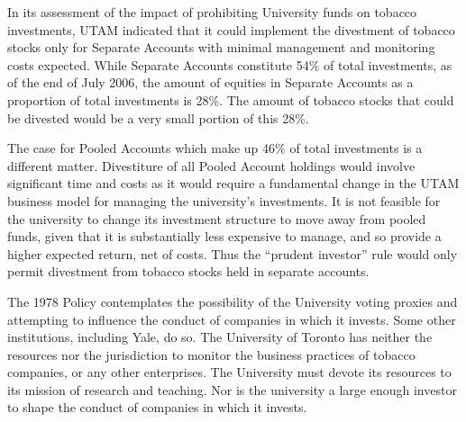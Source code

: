 In its assessment of the impact of prohibiting University funds on tobacco investments, UTAM indicated that it could implement the divestment of tobacco stocks only for Separate Accounts with minimal management and monitoring costs expected. 
While Separate Accounts constitute 54\% of total investments, as of the end of July 2006, the amount of equities in Separate Accounts as a proportion of total investments is 28\%. 
The amount of tobacco stocks that could be divested would be a very small portion of this 28\%.



The case for Pooled Accounts which make up 46\% of total investments is a different matter. 
Divestiture of all Pooled Account holdings would involve significant time and costs as it would require a fundamental change in the UTAM business model for managing the university’s investments. 
It is not feasible for the university to change its investment structure to move away from pooled funds, given that it is substantially less expensive to manage, and so provide a higher expected return, net of costs. 
Thus the ``prudent investor'' rule would only permit divestment from tobacco stocks held in separate accounts.



The 1978 Policy contemplates the possibility of the University voting proxies and attempting to influence the conduct of companies in which it invests. 
Some other institutions, including Yale, do so. 
The University of Toronto has neither the resources nor the jurisdiction to monitor the business practices of tobacco companies, or any other enterprises. 
The University must devote its resources to its mission of research and teaching. 
Nor is the university a large enough investor to shape the conduct of companies in which it invests. 




